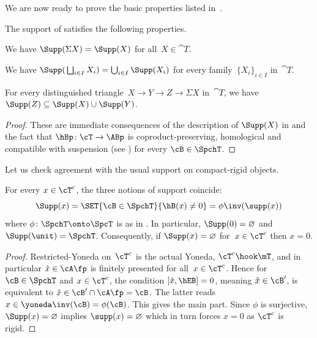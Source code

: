 We are now ready to prove the basic properties listed in~.

\begin{Prop}
\label{Prop:support}
The support of  satisfies the following properties.
\begin{enumeratea}
\item
\label{it:Supp-sigma}
We have $\Supp(\Sigma X)=\Supp(X)$ for all~$X\in\cat{T}$.

\item
\label{it:Supp-coprod}
We have $\Supp(\,\bigsqcup_{i\in I} X_i)=\bigcup_{i\in I}\Supp(X_i)$ for every family~$\{X_i\}_{i\in I}$ in~$\cat{T}$.

\item
\label{it:Supp-triangle}
For every distinguished triangle~$X\to Y\to Z\to \Sigma X$ in~$\cat{T}$, we have $\Supp(Z)\subseteq\Supp(X)\cup\Supp(Y)$.
\end{enumeratea}
\end{Prop}

\begin{proof}
These are immediate consequences of the description of $\Supp(X)$ in  and the fact that $\hBp\colon \cT\to \ABp$ is coproduct-preserving, homological and compatible with suspension (see ) for every $\cB\in\SpchT$.
\end{proof}

Let us check agreement with the usual support on compact-rigid objects.

\begin{Prop}
\label{Prop:agree}
For every $x\in\cT^c$, the three notions of support coincide:
\[
\Supp(x)=\SET{\cB\in\SpchT}{\hB(x)\neq 0}=\phi\inv(\supp(x))
\]
where $\phi\colon \SpchT\onto \SpcT$ is as in . In particular, $\Supp(0)=\varnothing$ and $\Supp(\unit)=\SpchT$. Consequently, if $\Supp(x)=\varnothing$ for~$x\in\cT^c$ then $x=0$.
\end{Prop}

\begin{proof}
Restricted-Yoneda on~$\cT^c$ is the actual Yoneda, $\cT^c\hook\mT$, and in particular $\hat x\in\cA\fp$ is finitely presented for all~$x\in\cT^c$. Hence for $\cB\in\SpchT$ and $x\in\cT^c$, the condition $[\hat x,\hEB]=0$, meaning $\hat x\in\cB'$, is equivalent to $\hat x\in\cB'\cap \cA\fp=\cB$. The latter reads $x\in\yoneda\inv(\cB)=\phi(\cB)$. This gives the main part. Since $\phi$ is surjective, $\Supp(x)=\varnothing$ implies $\supp(x)=\varnothing$ which in turn forces $x=0$ as $\cT^c$ is rigid.
\end{proof}

